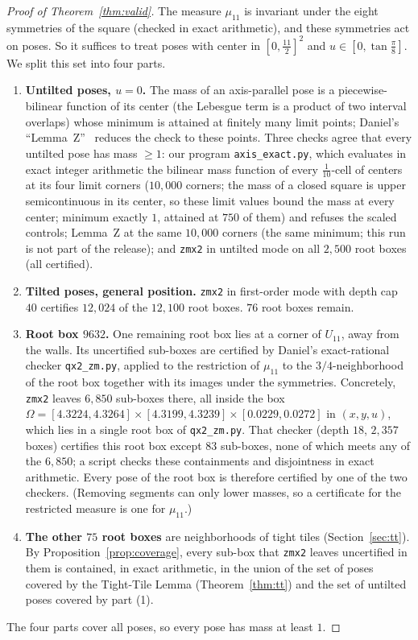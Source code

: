 \documentclass[11pt]{amsart}
\theoremstyle{definition}
\theoremstyle{remark}
\begin{document}
\begin{proof}[Proof of Theorem~\ref{thm:valid}]
The measure $\mu_{11}$ is invariant under the eight symmetries of the square (checked in exact arithmetic), and
these symmetries act on poses. So it suffices to treat poses with center in $[0,\frac{11}2]^2$ and
$u\in[0,\tan\frac\pi8]$. We split this set into four parts.

\begin{enumerate}
\item \textbf{Untilted poses, $u=0$.} The mass of an axis-parallel pose is a piecewise-bilinear function of its
center (the Lebesgue term is a product of two interval overlaps) whose minimum is attained at finitely many limit points; Daniel's ``Lemma~Z''~\cite{daniel} reduces the check
to these points. Three checks agree that every untilted pose has mass $\ge1$: our program \texttt{axis\_exact.py}, which evaluates in exact
integer arithmetic the bilinear mass function of every $\frac1{10}$-cell of centers at its four limit corners
($10{,}000$ corners; the mass of a closed square is upper semicontinuous in its center, so these limit values bound the
mass at every center; minimum exactly $1$, attained at $750$ of them) and refuses the scaled controls; Lemma~Z at the
same $10{,}000$ corners (the same minimum; this run is not part of the release); and \texttt{zmx2} in untilted mode on
all $2{,}500$ root boxes (all certified).
\item \textbf{Tilted poses, general position.} \texttt{zmx2} in first-order mode with depth cap $40$ certifies
$12{,}024$ of the $12{,}100$ root boxes. $76$ root boxes remain.
\item \textbf{Root box $9632$.} One remaining root box lies at a corner of $U_{11}$, away from the walls. Its
uncertified sub-boxes are certified by Daniel's exact-rational checker \texttt{qx2\_zm.py}, applied to the
restriction of $\mu_{11}$ to the $3/4$-neighborhood of the root box together with its images under the symmetries.
Concretely, \texttt{zmx2} leaves $6{,}850$ sub-boxes there, all inside the box
$\Omega=[4.3224,4.3264]\times[4.3199,4.3239]\times[0.0229,0.0272]$ in $(x,y,u)$, which lies in a single root box of
\texttt{qx2\_zm.py}. That checker (depth $18$, $2{,}357$ boxes) certifies this root box except $83$ sub-boxes, none of which
meets any of the $6{,}850$; a script checks these containments and disjointness in exact arithmetic. Every pose of
the root box is therefore certified by one of the two checkers. (Removing segments can only lower masses, so a
certificate for the restricted measure is one for $\mu_{11}$.)
\item \textbf{The other $75$ root boxes} are neighborhoods of tight tiles (Section~\ref{sec:tt}). By
Proposition~\ref{prop:coverage}, every sub-box that \texttt{zmx2} leaves uncertified in them is contained, in exact
arithmetic, in the union of the set of poses covered by the Tight-Tile Lemma (Theorem~\ref{thm:tt}) and the set of
untilted poses covered by part (1).
\end{enumerate}
The four parts cover all poses, so every pose has mass at least $1$.
\end{proof}
\end{document}
